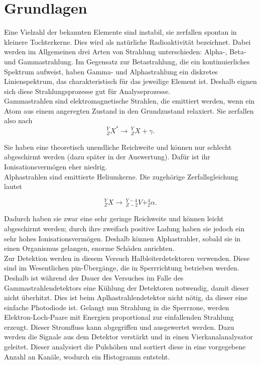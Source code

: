 
\chapter{Grundlagen}

Eine Vielzahl der bekannten Elemente sind instabil, sie zerfallen spontan in kleinere Tochterkerne. Dies wird als natürliche 
Radioaktivität bezeichnet. Dabei werden im Allgemeinen drei Arten von Strahlung unterschieden: Alpha-, Beta- und Gammastrahlung. 
Im Gegensatz zur Betastrahlung, die ein kontinuierliches Spektrum aufweist, haben Gamma- und Alphastrahlung ein diskretes Linienspektrum, 
das charakteristisch für das jeweilige Element ist. Deshalb eignen sich diese Strahlungsprozesse gut für Analyseprozesse. \\

Gammastrahlen sind elektromagnetische Strahlen, die emittiert werden, wenn ein Atom aus einem angeregten Zustand in den Grundzustand 
relaxiert. Sie zerfallen also nach\
\begin{equation*}
    ^Y_ZX^* \to \, ^Y_ZX + \gamma.
\end{equation*}

Sie haben eine theoretisch unendliche Reichweite und können nur schlecht abgeschirmt werden (dazu später in der Auswertung). Dafür ist 
ihr Ionisationsvermögen eher niedrig. \\

Alphastrahlen sind emittierte Heliumkerne. Die zugehörige Zerfallsgleichung lautet

\begin{equation*}
    ^Y_ZX \to \, ^{Y-4}_{Z-2}V + ^4_2\alpha.
\end{equation*}

Dadurch haben sie zwar eine sehr geringe Reichweite und können leicht abgeschirmt werden; durch ihre zweifach positive Ladung haben sie 
jedoch ein sehr hohes Ionisationsvermögen. Deshalb können Alphastrahler, sobald sie in einen Organismus gelangen, enorme Schäden anrichten. \\

Zur Detektion werden in diesem Versuch Halbleiterdetektoren verwenden. Diese sind im Wesentlichen pin-Übergänge, die in Sperrrichtung 
betrieben werden. Deshalb ist während der Dauer des Versuches im Falle des Gammastrahlendetektors eine Kühlung der Detektoren notwendig, damit dieser nicht überhitzt. 
Dies ist beim Aplhastrahlendetektor nicht nötig, da dieser eine einfache Photodiode ist. 
Gelangt nun Strahlung in die Sperrzone, werden Elektron-Loch-Paare mit Energien proportional zur einfallenden Strahlung erzeugt. Dieser 
Stromfluss kann abgegriffen und ausgewertet werden. Dazu werden die Signale aus dem Detektor verstärkt und in einen Vierkanalanalysator 
geleitet. Dieser analysiert die Pulshöhen und sortiert diese in eine vorgegebene Anzahl an Kanäle, wodurch ein Histogramm entsteht.\\

